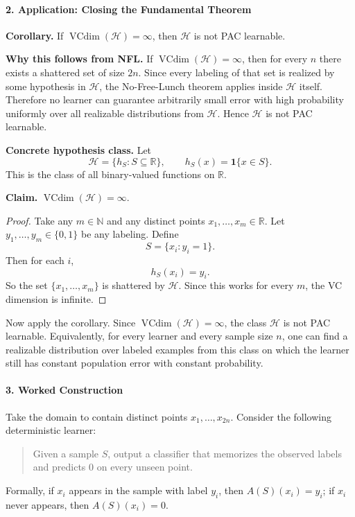 \documentclass[11pt]{article}
\newcommand{\R}{\mathbb{R}}
\newcommand{\N}{\mathbb{N}}
\newcommand{\ind}{\mathbf{1}}
\begin{document}
\begin{solutionbox}
\medskip

\paragraph{2. Application: Closing the Fundamental Theorem}

\textbf{Corollary.} If $\operatorname{VCdim}(\mathcal H)=\infty$, then $\mathcal H$ is not PAC learnable.

\medskip
\textbf{Why this follows from NFL.} If $\operatorname{VCdim}(\mathcal H)=\infty$, then for every $n$ there exists a shattered set of size $2n$. Since every labeling of that set is realized by some hypothesis in $\mathcal H$, the No-Free-Lunch theorem applies inside $\mathcal H$ itself. Therefore no learner can guarantee arbitrarily small error with high probability uniformly over all realizable distributions from $\mathcal H$. Hence $\mathcal H$ is not PAC learnable.

\medskip
\textbf{Concrete hypothesis class.} Let
\[
\mathcal H = \{h_S : S\subseteq \R\},
\qquad
h_S(x)=\ind\{x\in S\}.
\]
This is the class of all binary-valued functions on $\R$.

\medskip
\textbf{Claim.} $\operatorname{VCdim}(\mathcal H)=\infty$.

\begin{proof}
Take any $m\in\N$ and any distinct points $x_1,\dots,x_m\in\R$. Let $y_1,\dots,y_m\in\{0,1\}$ be any labeling. Define
\[
S = \{x_i : y_i=1\}.
\]
Then for each $i$,
\[
h_S(x_i)=y_i.
\]
So the set $\{x_1,\dots,x_m\}$ is shattered by $\mathcal H$. Since this works for every $m$, the VC dimension is infinite.
\end{proof}

Now apply the corollary. Since $\operatorname{VCdim}(\mathcal H)=\infty$, the class $\mathcal H$ is not PAC learnable. Equivalently, for every learner and every sample size $n$, one can find a realizable distribution over labeled examples from this class on which the learner still has constant population error with constant probability.

\medskip

\paragraph{3. Worked Construction}
Take the domain to contain distinct points $x_1,\dots,x_{2n}$. Consider the following deterministic learner:
\begin{quote}
Given a sample $S$, output a classifier that memorizes the observed labels and predicts $0$ on every unseen point.
\end{quote}
Formally, if $x_i$ appears in the sample with label $y_i$, then $A(S)(x_i)=y_i$; if $x_i$ never appears, then $A(S)(x_i)=0$.


\end{solutionbox}
\end{document}
